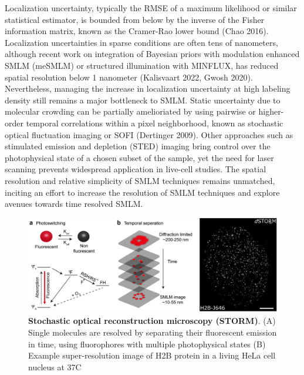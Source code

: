 \documentclass{ucetd}
\begin{document}
Localization uncertainty, typically the RMSE of a maximum likelihood or similar statistical estimator, is bounded from below by the inverse of the Fisher information matrix, known as the Cramer-Rao lower bound (Chao 2016). Localization uncertainties in sparse conditions are often tens of nanometers, although recent work on integration of Bayesian priors with modulation enhanced SMLM (meSMLM) or structured illumination with MINFLUX, has reduced spatial resolution below 1 nanometer (Kalisvaart 2022, Gwosh 2020). Nevertheless, managing the increase in localization uncertainty at high labeling density still remains a major bottleneck to SMLM. Static uncertainty due to molecular crowding can be partially amelioriated by using pairwise or higher-order temporal correlations within a pixel neighborhood, known as stochastic optical fluctuation imaging or SOFI (Dertinger 2009). Other approaches such as stimulated emission and depletion (STED) imaging bring control over the photophysical state of a chosen subset of the sample, yet the need for laser scanning prevents widespread application in live-cell studies. The spatial resolution and relative simplicity of SMLM techniques remains unmatched, inciting an effort to increase the resolution of SMLM techniques and explore avenues towards time resolved SMLM.

\begin{figure}
\includegraphics[width=\textwidth]{Intro.png}
\caption{\textbf{Stochastic optical reconstruction microscopy (STORM)}. (A) Single molecules are resolved by separating their fluorescent emission in time, using fluorophores with multiple photophysical states (B) Example super-resolution image of H2B protein in a living HeLa cell nucleus at 37C}
\end{figure}
\end{document}
